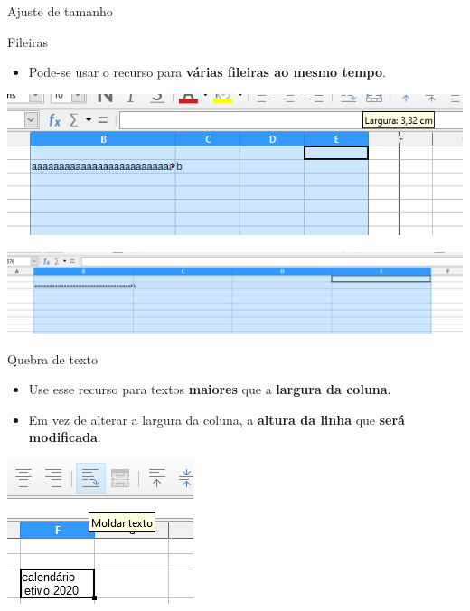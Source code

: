 \begin{frame}{Ajuste de tamanho}
	\begin{block}{Fileiras}
		\begin{itemize}
			\item Pode-se usar o recurso para \textbf{várias fileiras ao mesmo tempo}.
		\end{itemize}
	\end{block}
	
	\bigskip
	
	\centering
	\includegraphics[width=0.6\linewidth]{Figuras/Ch06/fig23}
	
	\bigskip
	
	\includegraphics[width=0.7\linewidth]{Figuras/Ch06/fig24}
\end{frame}


\begin{frame}{Quebra de texto}
	\begin{block}{}
		\begin{itemize}
			\item Use esse recurso para textos \textbf{maiores} que a \textbf{largura da coluna}.
			\item Em vez de alterar a largura da coluna, a \textbf{altura da linha} que \textbf{será modificada}.
		\end{itemize}
	\end{block}
	
	\centering
	\includegraphics[width=0.5\linewidth]{Figuras/Ch06/fig25}
\end{frame}



